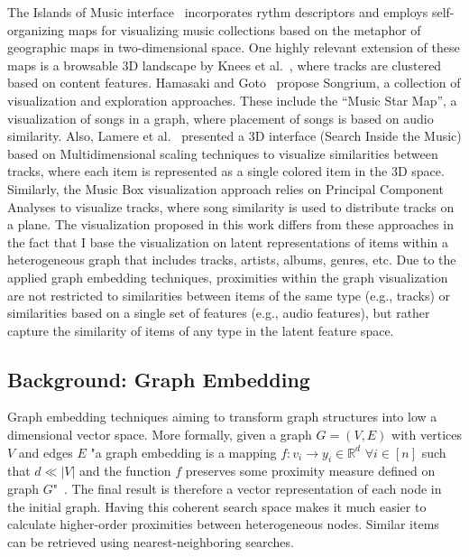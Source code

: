 \documentclass[sigconf]{acmart}
\begin{document}
The Islands of Music interface~\cite{pampalk2001islands} incorporates rythm descriptors and employs self-organizing maps for visualizing music collections based on the metaphor of geographic maps in two-dimensional space. One highly relevant extension of these maps is a browsable 3D landscape by Knees et al.~\cite{knees2006innovative}, where tracks are clustered based on content features. %
Hamasaki and Goto~\cite{Hamasaki:2013:SMB:2491055.2491059} propose Songrium, a collection of visualization and exploration approaches. These include the ``Music Star Map'', a visualization of songs in a graph, where placement of songs is based on audio similarity. Also, Lamere et al.~\cite{lamere2007using} presented a 3D interface (Search Inside the Music) based on Multidimensional scaling techniques to visualize similarities between tracks, where each item is represented as a single colored item in the 3D space. Similarly, the Music Box visualization approach relies on Principal Component Analyses to visualize tracks, where song similarity is used to distribute tracks on a plane. %
The visualization proposed in this work differs from these approaches in the fact that I base the visualization on latent representations of items within a heterogeneous graph that includes tracks, artists, albums, genres, etc. Due to the applied graph embedding techniques, proximities within the graph visualization are not restricted to similarities between items of the same type (e.g., tracks) or similarities based on a single set of features (e.g., audio features), but rather capture the similarity of items of any type in the latent feature space.


\subsection{Background: Graph Embedding}
Graph embedding techniques aiming to transform graph structures into low a dimensional vector space. More formally, given a graph $ G = (V,E) $ with vertices $ V $ and edges $ E $ "a graph embedding is a mapping $ f : v_{i} \rightarrow y_{i} \in \mathbb{R}^{d} $ $ \forall i \in [n] $ such that $ d \ll |V| $ and the function $ f $ preserves some proximity measure defined on graph $ G $"~\cite{goyal2017graph}. The final result is therefore a vector representation of each node in the initial graph. Having this coherent search space makes it much easier to calculate higher-order proximities between heterogeneous nodes. Similar items can be retrieved using nearest-neighboring searches.
\end{document}
